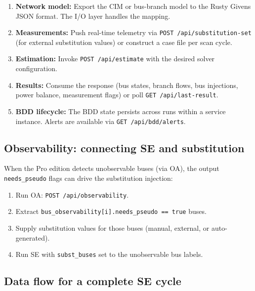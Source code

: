 \documentclass[11pt,a4paper]{article}
\begin{document}
\begin{enumerate}
  \item \textbf{Network model:} Export the CIM or bus-branch model to the
        Rusty Givens JSON format.  The I/O layer handles the mapping.
  \item \textbf{Measurements:} Push real-time telemetry via
        \texttt{POST /api/substitution-set} (for external substitution
        values) or construct a case file per scan cycle.
  \item \textbf{Estimation:} Invoke \texttt{POST /api/estimate} with the
        desired solver configuration.
  \item \textbf{Results:} Consume the response (bus states, branch flows,
        bus injections, power balance, measurement flags) or poll
        \texttt{GET /api/last-result}.
  \item \textbf{BDD lifecycle:} The BDD state persists across runs within
        a service instance.  Alerts are available via
        \texttt{GET /api/bdd/alerts}.
\end{enumerate}

\subsection{Observability: connecting SE and substitution}

When the Pro edition detects unobservable buses (via OA), the output
\texttt{needs\_pseudo} flags can drive the substitution injection:

\begin{enumerate}
  \item Run OA: \texttt{POST /api/observability}.
  \item Extract \texttt{bus\_observability[i].needs\_pseudo == true} buses.
  \item Supply substitution values for those buses (manual, external, or
        auto-generated).
  \item Run SE with \texttt{subst\_buses} set to the unobservable bus labels.
\end{enumerate}

\subsection{Data flow for a complete SE cycle}
\end{document}
